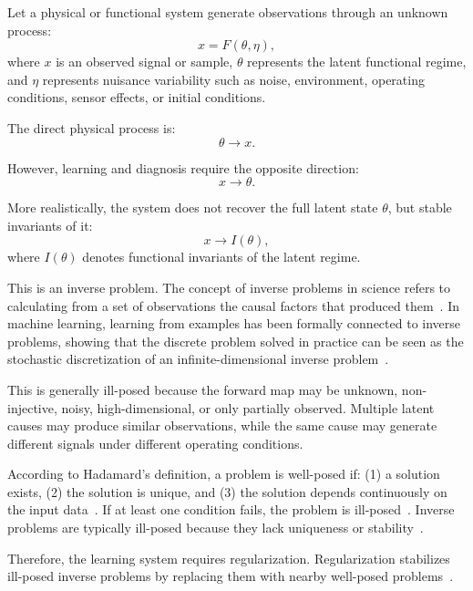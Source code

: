 \documentclass[11pt,a4paper]{article}
\begin{document}
Let a physical or functional system generate observations through an unknown process:
\begin{equation}
    x = F(\theta,\eta),
\end{equation}
where $x$ is an observed signal or sample, $\theta$ represents the latent functional regime, and $\eta$ represents nuisance variability such as noise, environment, operating conditions, sensor effects, or initial conditions.

The direct physical process is:
\begin{equation}
    \theta \longrightarrow x.
\end{equation}

However, learning and diagnosis require the opposite direction:
\begin{equation}
    x \longrightarrow \theta.
\end{equation}

More realistically, the system does not recover the full latent state $\theta$, but stable invariants of it:
\begin{equation}
    x \longrightarrow I(\theta),
\end{equation}
where $I(\theta)$ denotes functional invariants of the latent regime.

This is an inverse problem. The concept of inverse problems in science refers to calculating from a set of observations the causal factors that produced them~\cite{engll1996inverse}. In machine learning, learning from examples has been formally connected to inverse problems, showing that the discrete problem solved in practice can be seen as the stochastic discretization of an infinite-dimensional inverse problem~\cite{diVito2005LearningInverse}.

This is generally ill-posed because the forward map may be unknown, non-injective, noisy, high-dimensional, or only partially observed. Multiple latent causes may produce similar observations, while the same cause may generate different signals under different operating conditions.

According to Hadamard's definition, a problem is well-posed if: (1) a solution exists, (2) the solution is unique, and (3) the solution depends continuously on the input data~\cite{hadamard1932wellPosed}. If at least one condition fails, the problem is ill-posed~\cite{tikhonov1977illPosed}. Inverse problems are typically ill-posed because they lack uniqueness or stability~\cite{rosasco2004learningIllPosed}.

Therefore, the learning system requires regularization. Regularization stabilizes ill-posed inverse problems by replacing them with nearby well-posed problems~\cite{tikhonov1977illPosed}.
\end{document}
